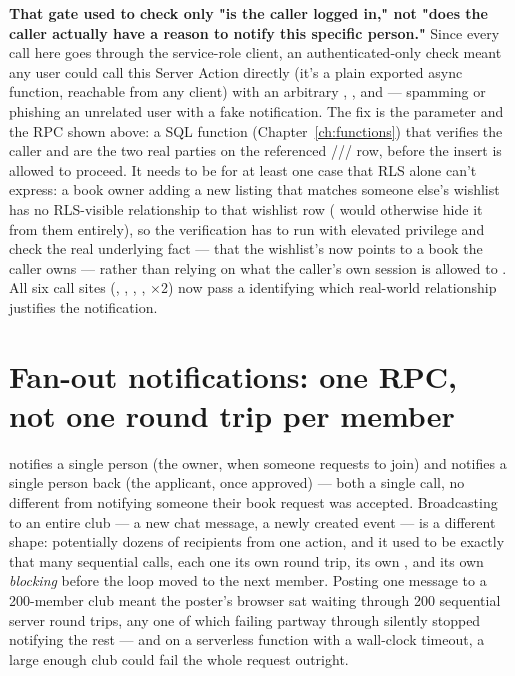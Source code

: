 \begin{olknote}
\textbf{That gate used to check only "is the caller logged in," not "does the caller actually have a reason to notify this specific person."} Since every call here goes through the service-role client, an authenticated-only check meant any user could call this Server Action directly (it's a plain exported async function, reachable from any client) with an arbitrary , , and  — spamming or phishing an unrelated user with a fake notification. The fix is the  parameter and the  RPC shown above: a  SQL function (Chapter~\ref{ch:functions}) that verifies the caller and  are the two real parties on the referenced /// row, before the insert is allowed to proceed. It needs to be  for at least one case that RLS alone can't express: a book owner adding a new listing that matches someone else's wishlist has no RLS-visible relationship to that wishlist row ( would otherwise hide it from them entirely), so the verification has to run with elevated privilege and check the real underlying fact — that the wishlist's  now points to a book the caller owns — rather than relying on what the caller's own session is allowed to . All six call sites (, , , ,  $\times$2) now pass a  identifying which real-world relationship justifies the notification.
\end{olknote}

\section{Fan-out notifications: one RPC, not one round trip per member}

 notifies a single person (the owner, when someone requests to join) and  notifies a single person back (the applicant, once approved) — both a single  call, no different from notifying someone their book request was accepted. Broadcasting to an entire club — a new chat message, a newly created event — is a different shape: potentially dozens of recipients from one action, and it used to be exactly that many sequential  calls, each one its own  round trip, its own , and its own \emph{blocking}  before the loop moved to the next member. Posting one message to a 200-member club meant the poster's browser sat waiting through 200 sequential server round trips, any one of which failing partway through silently stopped notifying the rest — and on a serverless function with a wall-clock timeout, a large enough club could fail the whole request outright.

